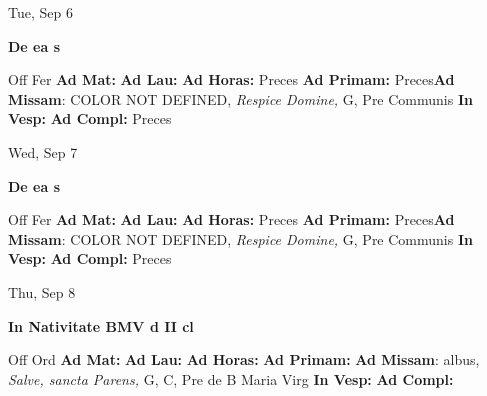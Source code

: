 \documentclass[10pt]{memoir}
\begin{document}
\begin{center}
\begin{minipage}{3.5in}
\vspace{2em}
\begin{center}Tue, Sep 6
\end{center}
\textbf{ \large De ea
\textnormal{\normalsize s}}

\begin{justify}Off Fer
\textbf{Ad Mat: }
\textbf{Ad Lau: }
\textbf{Ad Horas: }Preces
\textbf{Ad Primam: }Preces\textbf{Ad Missam}: COLOR NOT DEFINED, \textit{Respice Domine,} G, Pre Communis
\textbf{In Vesp: }
\textbf{Ad Compl: }Preces
\end{justify}
\end{minipage}
\end{center}

\begin{center}
\begin{minipage}{3.5in}
\vspace{2em}
\begin{center}Wed, Sep 7
\end{center}
\textbf{ \large De ea
\textnormal{\normalsize s}}

\begin{justify}Off Fer
\textbf{Ad Mat: }
\textbf{Ad Lau: }
\textbf{Ad Horas: }Preces
\textbf{Ad Primam: }Preces\textbf{Ad Missam}: COLOR NOT DEFINED, \textit{Respice Domine,} G, Pre Communis
\textbf{In Vesp: }
\textbf{Ad Compl: }Preces
\end{justify}
\end{minipage}
\end{center}

\begin{center}
\begin{minipage}{3.5in}
\vspace{2em}
\begin{center}Thu, Sep 8
\end{center}
\textbf{ \large In Nativitate BMV
\textnormal{\normalsize d II cl}}

\begin{justify}Off Ord
\textbf{Ad Mat: }
\textbf{Ad Lau: }
\textbf{Ad Horas: }
\textbf{Ad Primam: }\textbf{Ad Missam}: albus, \textit{Salve, sancta Parens,} G, C, Pre de B Maria Virg
\textbf{In Vesp: }
\textbf{Ad Compl: }
\end{justify}
\end{minipage}
\end{center}
\end{document}
